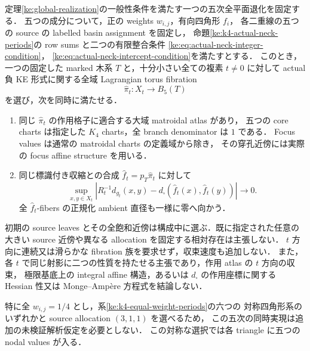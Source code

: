 \begin{theorem}
\label{ke:quintic-simultaneous-realization}
定理\ref{ke:global-realization}の一般性条件を満たす一つの五次全平面退化を固定する．
五つの成分について，正の weights $w_{i,j}$，有向四角形 $f_i$，
各二重線の五つの source の labelled basin assignment を固定し，
命題\ref{ke:k4-actual-neck-periods}の row sums と二つの有限整合条件
\eqref{ke:eq:actual-neck-integer-condition}，
\eqref{ke:eq:actual-neck-intercept-condition}を満たすとする．
このとき，一つの固定した marked 木系 $T$ と，十分小さい全ての複素 $t\ne0$ に対して
actual 負 KE 形式に関する全域 Lagrangian torus fibration
\[
 \widehat\pi_t:X_t\longrightarrow B_5(T)
\]
を選び，次を同時に満たせる．
\begin{enumerate}
\item 同じ $\widehat\pi_t$ の作用格子に適合する大域 matroidal atlas があり，
五つの core charts は指定した $K_4$ charts，全 branch denominator は $1$ である．
Focus values は通常の matroidal charts の定義域から除き，
その穿孔近傍には実際の focus affine structure を用いる．
\item 同じ標識付き収縮との合成 $\widehat f_t=p_T\widehat\pi_t$ に対して
\begin{equation}\label{ke:eq:quintic-simultaneous-distortion}
 \sup_{x,y\in X_t}
 \left|R_t^{-1}d_{g_t}(x,y)
       -d_\square(\widehat f_t(x),\widehat f_t(y))\right|
 \longrightarrow0.
\end{equation}
全 $\widehat f_t$-fibers の正規化 ambient 直径も一様に零へ向かう．
\end{enumerate}
初期の source leaves とその全飽和近傍は構成中に選ぶ．既に指定された任意の
大きい source 近傍や異なる allocation を固定する相対存在は主張しない．
$t$ 方向に連続又は滑らかな fibration 族を要求せず，収束速度も追加しない．
また，各 $t$ で同じ射影に二つの性質を持たせる主張であり，作用 atlas の $t$ 方向の収束，
極限基底上の integral affine 構造，あるいは $d_\square$ の作用座標に関する
Hessian 性又は Monge--Amp\`ere 方程式を結論しない．

特に全 $w_{i,j}=1/4$ とし，系\ref{ke:k4-equal-weight-periods}の六つの
対称四角形系のいずれかと source allocation $(3,1,1)$ を選べるため，
この五次の同時実現は追加の未検証解析仮定を必要としない．
この対称な選択では各 triangle に五つの nodal values が入る．
\end{theorem}

